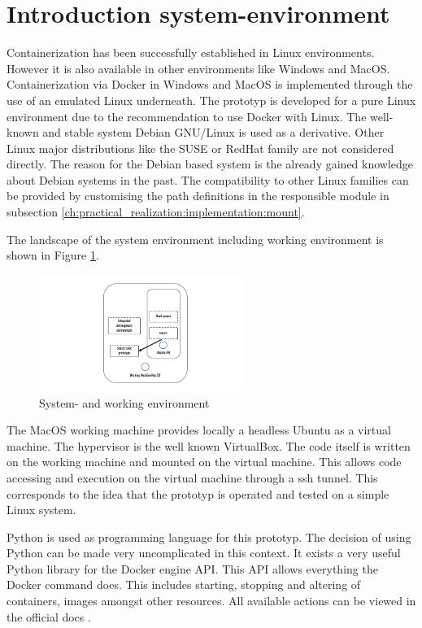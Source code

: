 \section{Introduction system-environment}
\label{ch:practical_realization:sys_env}

Containerization has been successfully established in Linux environments.
However it is also available in other environments like Windows and MacOS.
Containerization via Docker in Windows and MacOS is implemented through the use of an emulated Linux underneath.
The prototyp is developed for a pure Linux environment due to the recommendation to use Docker with Linux.
The well-known and stable system Debian GNU/Linux is used as a derivative. Other Linux major distributions like the SUSE or RedHat family are not considered directly. The reason for the Debian based system is the already gained knowledge about Debian systems in the past. The compatibility to other Linux families can be provided by customising the path definitions in the responsible module in subsection \ref{ch:practical_realization:implementation:mount}. 

The landscape of the system environment including working environment is shown in Figure \ref{fig:pract:sys_env}.
\begin{figure}[h!]
 \centering
 \includegraphics[width=0.6\textwidth]{gfx/examples/sys_env.png}
 \caption{System- and working environment}
 \label{fig:pract:sys_env}
\end{figure}
The MacOS working machine provides locally a headless Ubuntu as a virtual machine. The hypervisor is the well known VirtualBox.
The code itself is written on the working machine and mounted on the virtual machine. This allows code accessing and execution on the virtual machine through a ssh tunnel. This corresponds to the idea that the prototyp is operated and tested on a simple Linux system.

Python is used as programming language for this prototyp. The decision of using Python can be made very uncomplicated in this context. It exists a very useful Python library for the Docker engine API. This API allows everything the Docker command does. This includes starting, stopping and altering of containers, images amongst other resources. All available actions can be viewed in the official docs \cite{python_sdk}. 

